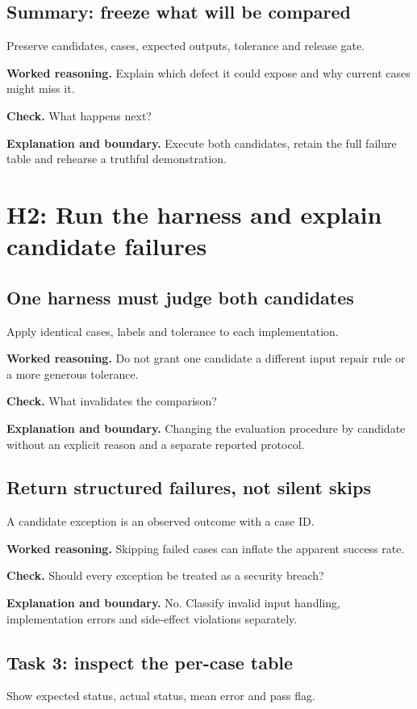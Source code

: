 \subsection{Summary: freeze what will be compared}
Preserve candidates, cases, expected outputs, tolerance and release gate.

\textbf{Worked reasoning.} Explain which defect it could expose and why current cases might miss it.

\textbf{Check.} What happens next?

\textbf{Explanation and boundary.} Execute both candidates, retain the full failure table and rehearse a truthful demonstration.

\section{H2: Run the harness and explain candidate failures}
\subsection{One harness must judge both candidates}
Apply identical cases, labels and tolerance to each implementation.

\textbf{Worked reasoning.} Do not grant one candidate a different input repair rule or a more generous tolerance.

\textbf{Check.} What invalidates the comparison?

\textbf{Explanation and boundary.} Changing the evaluation procedure by candidate without an explicit reason and a separate reported protocol.

\subsection{Return structured failures, not silent skips}
A candidate exception is an observed outcome with a case ID.

\textbf{Worked reasoning.} Skipping failed cases can inflate the apparent success rate.

\textbf{Check.} Should every exception be treated as a security breach?

\textbf{Explanation and boundary.} No. Classify invalid input handling, implementation errors and side-effect violations separately.

\subsection{Task 3: inspect the per-case table}
Show expected status, actual status, mean error and pass flag.

